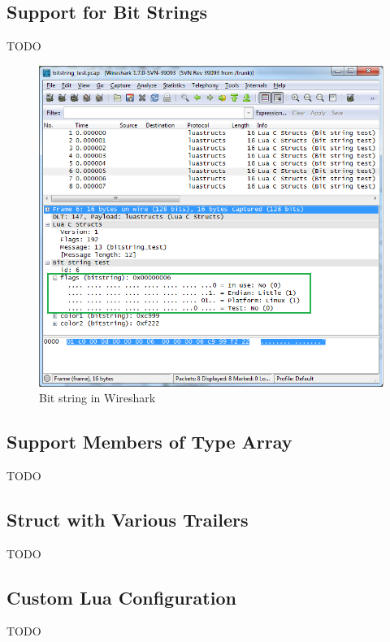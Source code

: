 



\subsection{Support for Bit Strings}
TODO

\begin{figure}[ht]
	\center
	\includegraphics[width=\textwidth]{./sprints/img/wireshark_bitstring}
	\caption{Bit string in Wireshark\label{fig:wsbitstringt}}
\end{figure}

\subsection{Support Members of Type Array}
TODO

\subsection{Struct with Various Trailers}
TODO

\subsection{Custom Lua Configuration}
TODO

